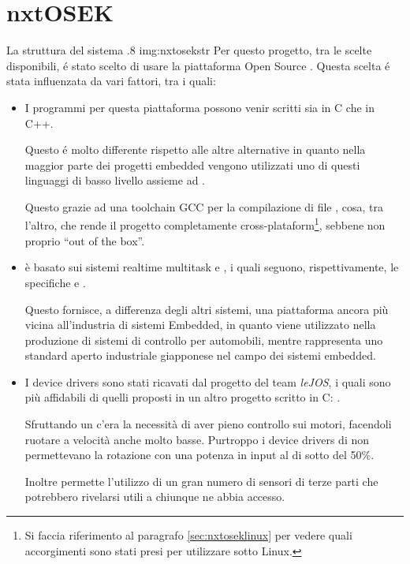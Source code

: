 \section{nxtOSEK}
        {La struttura del sistema \nxtOSEK{}}
        {.8}
        {img:nxtosekstr}
Per questo progetto, tra le scelte disponibili, \'e stato scelto di usare
la piattaforma Open Source \nxtOSEK{}. Questa scelta \'e stata influenzata
da vari fattori, tra i quali:
\begin{itemize}
    \item I programmi per questa piattaforma possono venir scritti sia in C
        che in C++.

        Questo \'e molto differente rispetto alle altre alternative in
        quanto nella maggior parte dei progetti embedded vengono utilizzati
        uno di questi linguaggi di basso livello assieme ad
        .

        Questo grazie ad una toolchain GCC per la compilazione di file
        , cosa, tra l'altro, che rende il progetto
        completamente cross-plataform\footnote{Si faccia riferimento al
        paragrafo \ref{sec:nxtoseklinux} per vedere quali accorgimenti
        sono stati presi per utilizzare \nxtOSEK{} sotto Linux.}, sebbene
        non proprio ``out of the box''.
    \item \nxtOSEK{} è basato sui sistemi realtime multitask
         e , i quali
        seguono, rispettivamente, le specifiche  e
        .

        Questo fornisce, a differenza degli altri sistemi, una piattaforma
        ancora più vicina all'industria di sistemi Embedded, in quanto
         viene utilizzato nella produzione di sistemi di
        controllo per automobili, mentre 
        rappresenta uno standard aperto industriale giapponese nel campo dei
        sistemi embedded.
    \item I device drivers sono stati ricavati dal progetto 
        del team \emph{leJOS}, i quali sono più affidabili di quelli
        proposti in un altro progetto scritto in C: .

        Sfruttando un \PID{} c'era la necessità di aver pieno controllo sui
        motori, facendoli ruotare a velocità anche molto basse. Purtroppo
        i device drivers di  non permettevano la rotazione
        con una potenza in input al di sotto del 50\%.

        Inoltre \nxtOSEK{} permette l'utilizzo di un gran numero di sensori
        di terze parti che potrebbero rivelarsi utili a chiunque ne abbia
        accesso.
\end{itemize}

